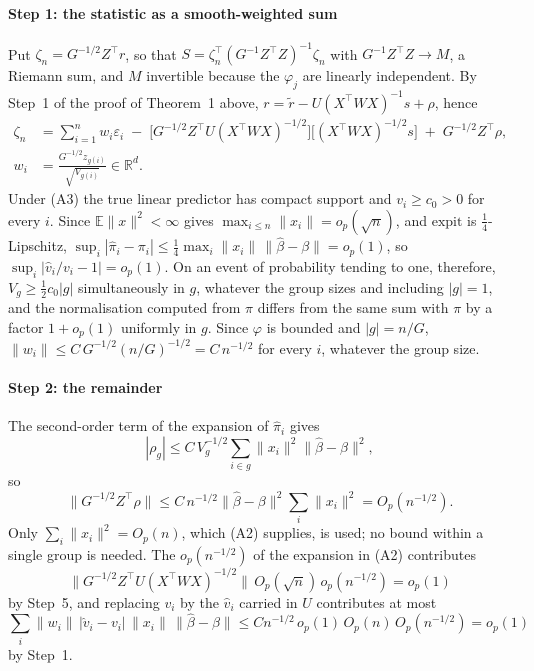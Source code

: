 \documentclass[11pt]{article}
\begin{document}
\paragraph{Step 1: the statistic as a smooth-weighted sum} Put $\zeta_n=G^{-1/2}Z^\top r$, so that
$S=\zeta_n^\top(G^{-1}Z^\top Z)^{-1}\zeta_n$ with $G^{-1}Z^\top Z\to M$, a Riemann sum, and $M$
invertible because the $\varphi_j$ are linearly independent. By Step~1 of the proof of
Theorem~1 above, $r=\tilde r-U(X^\top WX)^{-1}s+\rho$, hence
\begin{equation}\label{si:zeta}
\begin{split}
\zeta_n&=\sum_{i=1}^n w_i\varepsilon_i\;-\;\big[G^{-1/2}Z^\top U(X^\top WX)^{-1/2}\big]
\big[(X^\top WX)^{-1/2}s\big]\;+\;G^{-1/2}Z^\top\rho,\\
w_i&=\frac{G^{-1/2}z_{g(i)}}{\sqrt{V_{g(i)}}}\in\mathbb{R}^d .
\end{split}
\end{equation}
Under (A3) the true linear predictor has compact support and $v_i\ge c_0>0$ for every $i$. Since
$\mathbb{E}\|x\|^2<\infty$ gives $\max_{i\le n}\|x_i\|=o_p(\sqrt n)$, and $\mathrm{expit}$ is
$\tfrac14$-Lipschitz, $\sup_i|\hat\pi_i-\pi_i|\le\tfrac14\max_i\|x_i\|\,\|\hat\beta-\beta\|=o_p(1)$,
so $\sup_i|\hat v_i/v_i-1|=o_p(1)$. On an event of probability tending to one, therefore,
$V_g\ge\tfrac12c_0|g|$ simultaneously in $g$, whatever the group sizes and including $|g|=1$, and
the normalisation computed from $\hat\pi$ differs from the same sum with $\pi$ by a factor
$1+o_p(1)$ uniformly in $g$. Since $\varphi$ is bounded and $|g|=n/G$,
$\|w_i\|\le C\,G^{-1/2}(n/G)^{-1/2}=C\,n^{-1/2}$ for every $i$, whatever the group size.

\paragraph{Step 2: the remainder} The second-order term of the expansion of $\hat\pi_i$ gives
\[
|\rho_g|\le C\,V_g^{-1/2}\sum_{i\in g}\|x_i\|^2\|\hat\beta-\beta\|^2,
\]
so
\[
\|G^{-1/2}Z^\top\rho\|\le C\,n^{-1/2}\|\hat\beta-\beta\|^2\sum_i\|x_i\|^2=O_p(n^{-1/2}).
\]
Only
$\sum_i\|x_i\|^2=O_p(n)$, which (A2) supplies, is used; no bound within a single group is needed.
The $o_p(n^{-1/2})$ of the expansion in (A2) contributes
\[
\|G^{-1/2}Z^\top U(X^\top WX)^{-1/2}\|\,O_p(\sqrt n)\,o_p(n^{-1/2})=o_p(1)
\]
by Step~5, and
replacing $v_i$ by the $\hat v_i$ carried in $U$ contributes at most
\[
\sum_i\|w_i\|\,|\hat v_i-v_i|\,\|x_i\|\,\|\hat\beta-\beta\|\le Cn^{-1/2}\,o_p(1)\,O_p(n)\,
O_p(n^{-1/2})=o_p(1)
\]
by Step~1.
\end{document}
